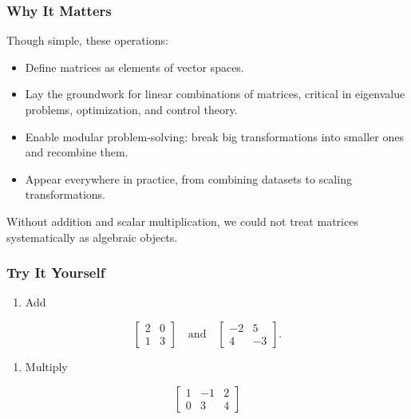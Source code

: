 \documentclass[
  letterpaper,
  DIV=11,
  numbers=noendperiod]{scrreprt}
\providecommand{\tightlist}{%
  \setlength{\itemsep}{0pt}\setlength{\parskip}{0pt}}
\begin{document}
\subsubsection{Why It Matters}\label{why-it-matters-9}

Though simple, these operations:

\begin{itemize}
\tightlist
\item
  Define matrices as elements of vector spaces.
\item
  Lay the groundwork for linear combinations of matrices, critical in
  eigenvalue problems, optimization, and control theory.
\item
  Enable modular problem-solving: break big transformations into smaller
  ones and recombine them.
\item
  Appear everywhere in practice, from combining datasets to scaling
  transformations.
\end{itemize}

Without addition and scalar multiplication, we could not treat matrices
systematically as algebraic objects.

\subsubsection{Try It Yourself}\label{try-it-yourself-12}

\begin{enumerate}
\def\labelenumi{\arabic{enumi}.}
\tightlist
\item
  Add
\end{enumerate}

\[
\begin{bmatrix} 
2 & 0 \\ 
1 & 3 
\end{bmatrix}
\quad \text{and} \quad
\begin{bmatrix} 
-2 & 5 \\ 
4 & -3 
\end{bmatrix}.
\]

\begin{enumerate}
\def\labelenumi{\arabic{enumi}.}
\setcounter{enumi}{1}
\tightlist
\item
  Multiply
\end{enumerate}

\[
\begin{bmatrix} 
1 & -1 & 2 \\ 
0 & 3 & 4 
\end{bmatrix}
\]
\end{document}

